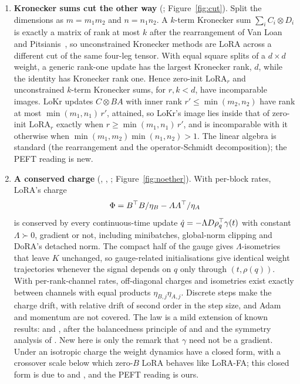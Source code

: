 \begin{enumerate}[label=\textbf{\arabic*.},leftmargin=1.9em]
\item \textbf{Kronecker sums cut the other way} (; Figure~\ref{fig:cut}). Split the dimensions as $m=m_1m_2$ and $n=n_1n_2$. A $k$-term Kronecker sum $\sum_iC_i\otimes D_i$ is exactly a matrix of rank at most $k$ after the rearrangement of Van Loan and Pitsianis~\citeyearpar{loan1993approximation}, so unconstrained Kronecker methods are LoRA across a different cut of the same four-leg tensor. With equal square splits of a $d\times d$ weight, a generic rank-one update has the largest Kronecker rank, $d$, while the identity has Kronecker rank one. Hence zero-init $\mathrm{LoRA}_r$ and unconstrained $k$-term Kronecker sums, for $r,k<d$, have incomparable images. LoKr \citep{yeh2023navigating} updates $C\otimes BA$ with inner rank $r'\le\min(m_2,n_2)$ have rank at most $\min(m_1,n_1)\,r'$, attained, so LoKr's image lies inside that of zero-init $\mathrm{LoRA}_r$ exactly when $r\ge\min(m_1,n_1)\,r'$, and is incomparable with it otherwise when $\min(m_1,m_2)\min(n_1,n_2)>1$. The linear algebra is standard (the rearrangement and the operator-Schmidt decomposition); the PEFT reading is new.

\item \textbf{A conserved charge} (, , ; Figure~\ref{fig:noether}). With per-block rates, LoRA's charge
\[
  \Phi=B^{\top} B/\eta_B-AA^{\top}/\eta_A
\]
is conserved by every continuous-time update $\dot q=-\Lambda D\rho_q^{\top}\gamma(t)$ with constant $\Lambda\succ0$, gradient or not, including minibatches, global-norm clipping and DoRA's \citep{liu2024dora} detached norm. The compact half of the gauge gives $\Lambda$-isometries that leave $K$ unchanged, so gauge-related initialisations give identical weight trajectories whenever the signal depends on $q$ only through $(t,\rho(q))$. With per-rank-channel rates, off-diagonal charges and isometries exist exactly between channels with equal products $\eta_{B,j}\eta_{A,j}$. Discrete steps make the charge drift, with relative drift of second order in the step size, and Adam and momentum are not covered. The law is a mild extension of known results: \citet[Prop.~5.1]{zhao2022symmetries} and \citet{marcotte2023abide}, after the balancedness principle of \citet{du2018algorithmic} and \citet{arora2018optimization} and the symmetry analysis of \citet{kunin2020neural}. New here is only the remark that $\gamma$ need not be a gradient. Under an isotropic charge the weight dynamics have a closed form, with a crossover scale below which zero-$B$ LoRA behaves like LoRA-FA; this closed form is due to \citet{xtarmoun2021understanding} and \citet{xmin2021explicit}, and the PEFT reading is ours.


\end{enumerate}
